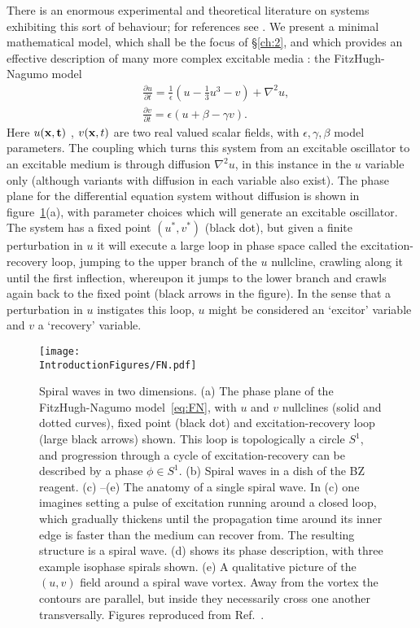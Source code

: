 There is an enormous experimental and theoretical literature on systems exhibiting this sort of behaviour; for references see \citep{WinfreeBook}. We present a minimal mathematical model, which shall be the focus of \S\ref{ch:2}, and which provides an effective description of many more complex excitable media \citep{WinfreeBook}: the FitzHugh-Nagumo model \citep{FitzHugh1961,Nagumo1962}
\begin{eqnarray}
&\frac{\partial u}{\partial t}= \frac{1}{\epsilon}(u - \frac{1}{3} u^3 - v) + \nabla^2 u, \\
&\frac{\partial v}{\partial t} = {\epsilon}(u + \beta - \gamma v).
\label{eq:FN}
\end{eqnarray}
Here $u(\bf {x} ,t)$ , $v({\bf x},t)$ are two real valued scalar fields, with $\epsilon,\gamma,\beta$ model parameters. The coupling which turns this system from an excitable oscillator to an excitable medium is through diffusion $\nabla^2 u$, in this instance in the $u$ variable only (although variants with diffusion in each variable also exist). The phase plane for the differential equation system without diffusion is shown in figure~\ref{fig:FN}(a), with parameter choices which will generate an excitable oscillator. The system has a fixed point $(u^*,v^*)$ (black dot), but given a finite perturbation in $u$ it will execute a large loop in phase space called the excitation-recovery loop, jumping to the upper branch of the $u$ nullcline, crawling along it until the first inflection, whereupon it jumps to the lower branch and crawls again back to the fixed point (black arrows in the figure). In the sense that a perturbation in $u$ instigates this loop, $u$ might be considered an `excitor' variable and $v$ a `recovery' variable.
\begin{figure}[htbp]
\centering
\texttt{[image: \\IntroductionFigures/FN.pdf]}
\caption{Spiral waves in two dimensions. (a) The phase plane of the FitzHugh-Nagumo model~\eqref{eq:FN}, with $u$ and $v$ nullclines (solid and dotted curves), fixed point (black dot) and excitation-recovery loop (large black arrows) shown. This loop is topologically a circle $S^1$, and progression through a cycle of excitation-recovery can be described by a phase $\phi \in S^1$. (b) Spiral waves in a dish of the BZ reagent. (c) --(e) The anatomy of a single spiral wave. In (c) one imagines setting a pulse of excitation running around a closed loop, which gradually thickens until the propagation time around its inner edge is faster than the medium can recover from. The resulting structure is a spiral wave. (d) shows its phase description, with three example isophase spirals shown. (e) A qualitative picture of the $(u,v)$ field around a spiral wave vortex. Away from the vortex the contours are parallel, but inside they necessarily cross one another transversally. Figures reproduced from Ref.~\citep{Winfree1983}. }
\label{fig:FN}
\end{figure}

